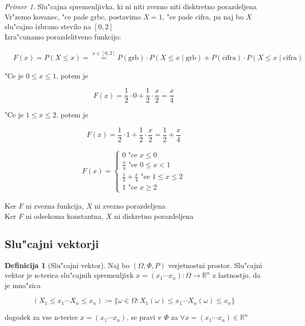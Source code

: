 \documentclass[a4paper,12pt]{article}
\theoremstyle{definition}
\newtheorem{defn}[counter]{Definicija}
\theoremstyle{remark}
\newtheorem*{ex}{Primer}
\newcommand{\R}{\mathbb{R}}
\begin{document}
\begin{ex}
    Slu"cajna spremenljivka, ki ni niti zvezno niti disktretno porazdeljena \\
    Vr"zemo kovanec, "ce pade grbc, postavimo $X=1$, "ce pade cifra, pa naj bo $X$ slu"cajno izbrano stevilo na
    $[0,2]$ \\
    Izra"cunamo porazdelitveno funkcijo:

    \begin{align*}
        &F(x) = P(X \leq x) = \stackrel{x \in [0,2]}{=} P(\text{grb}) \cdot P(X \leq x \mid \text{grb}) +
            P(\text{cifra}) \cdot P(X \leq x \mid \text{cifra})
    \end{align*}

    "Ce je $0 \leq x \leq 1$, potem je

    \begin{equation*}
        F(x) = \frac{1}{2} \cdot 0 + \frac{1}{2} \cdot \frac{x}{2} = \frac{x}{4}
    \end{equation*}

    "Ce je $1 \leq x \leq 2$, potem je

    \begin{equation*}
        F(x) = \frac{1}{2} \cdot 1 + \frac{1}{2} \cdot \frac{x}{2} = \frac{1}{2} + \frac{x}{4}
    \end{equation*}

    \begin{align*}
        F(x) = \begin{cases}
            0 \text{ "ce } x \leq 0 \\
            \frac{x}{4} \text{ "ce } 0 \leq x < 1 \\
            \frac{1}{2} + \frac{x}{4} \text{ "ce } 1 \leq x \leq 2 \\
            1 \text{ "ce } x \geq 2
        \end{cases}
    \end{align*}

    Ker $F$ ni zvezna funkcija, $X$ ni zvezno porazdeljena \\
    Ker $F$ ni odsekoma konstantna, $X$ ni diskretno porazdeljena
\end{ex}

\subsection{Slu"cajni vektorji}

\begin{defn}[Slu"cajni vektor]
    Naj bo $(\Omega, \Phi, P)$ verjetnostni prostor. Slu"cajni vektor je n-terica slu"cajnih spremenljivk
    $x = (x_1 \cdots x_n): \Omega \to \R^n$ z lastnostjo, da je mno"zica
    
    \begin{equation*}
        (X_1 \leq x_1 \cdots X_n \leq x_n) := \{\omega \in \Omega: X_1(\omega) \leq x_1 \cdots X_n(\omega) \leq x_n\}
    \end{equation*}

    dogodek za vse n-terice $x = (x_1 \cdots x_n)$, se pravi v $\Phi$ za $\forall x = (x_1 \cdots x_n) \in \R^n$
\end{defn}
\end{document}

